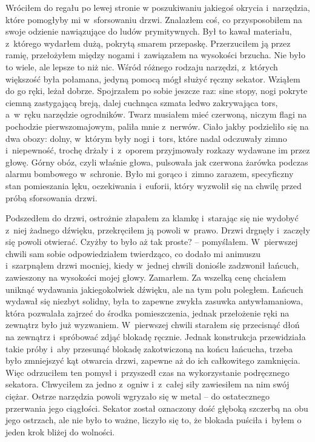 Wróciłem do regału po lewej stronie w poszukiwaniu jakiegoś okrycia i~narzędzia, które pomogłyby mi w~sforsowaniu drzwi. Znalazłem coś, co przysposobiłem na swoje odzienie nawiązujące do ludów prymitywnych. Był to kawał materiału, z~którego wydarłem dużą, pokrytą smarem przepaskę. Przerzuciłem ją przez ramię, przełożyłem między nogami i~zawiązałem na wysokości brzucha. Nie było to wiele, ale lepsze to niż nic. Wśród różnego rodzaju narzędzi, z~których większość była połamana, jedyną pomocą mógł służyć ręczny sekator. Wziąłem do go ręki, leżał dobrze. Spojrzałem po sobie jeszcze raz: sine stopy, nogi pokryte ciemną zastygającą breją, dalej cuchnąca szmata ledwo zakrywająca tors, a~w~ręku narzędzie ogrodników. Twarz musiałem mieć czerwoną, niczym flagi na pochodzie pierwszomajowym, paliła mnie z~nerwów. Ciało jakby podzieliło się na dwa obozy: dolny, w~którym były nogi i~tors, które nadal odczuwały zimno i~niepewność, trochę drżały i~z~oporem przyjmowały rozkazy wydawane im przez głowę. Górny obóz, czyli właśnie głowa, pulsowała jak czerwona żarówka podczas alarmu bombowego w~schronie. Było mi gorąco i~zimno zarazem, specyficzny stan pomieszania lęku, oczekiwania i~euforii, który wyzwolił się na chwilę przed próbą sforsowania drzwi.

Podszedłem do drzwi, ostrożnie złapałem za klamkę i~starając się nie wydobyć z~niej żadnego dźwięku, przekręciłem ją powoli w~prawo. Drzwi drgnęły i~zaczęły się powoli otwierać. Czyżby to było aż tak proste? -- pomyślałem. W~pierwszej chwili sam sobie odpowiedziałem twierdząco, co dodało mi animuszu i~szarpnąłem drzwi mocniej, kiedy w~jednej chwili doniośle zadzwonił łańcuch, zawieszony na wysokości mojej głowy. Zamarłem. Za wszelką cenę chciałem uniknąć wydawania jakiegokolwiek dźwięku, ale na tym polu poległem. Łańcuch wydawał się niezbyt solidny, była to zapewne zwykła zasuwka antywłamaniowa, która pozwalała zajrzeć do środka pomieszczenia, jednak przełożenie ręki na zewnątrz było już wyzwaniem. W~pierwszej chwili starałem się przecisnąć dłoń na zewnątrz i~spróbować zdjąć blokadę ręcznie. Jednak konstrukcja przewidziała takie próby i~aby przesunąć blokadę zakotwiczoną na końcu łańcucha, trzeba było zmniejszyć kąt otwarcia drzwi, zapewne aż do ich całkowitego zamknięcia. Więc odrzuciłem ten pomysł i~przyszedł czas na wykorzystanie podręcznego sekatora. Chwyciłem za jedno z~ogniw i~z~całej siły zawiesiłem na nim swój ciężar. Ostrze narzędzia powoli wgryzało się w metal -- do ostatecznego przerwania jego ciągłości. Sekator został oznaczony dość głęboką szczerbą na obu jego ostrzach, ale nie było to ważne, liczyło się to, że blokada puściła i~byłem o jeden krok bliżej do wolności.

